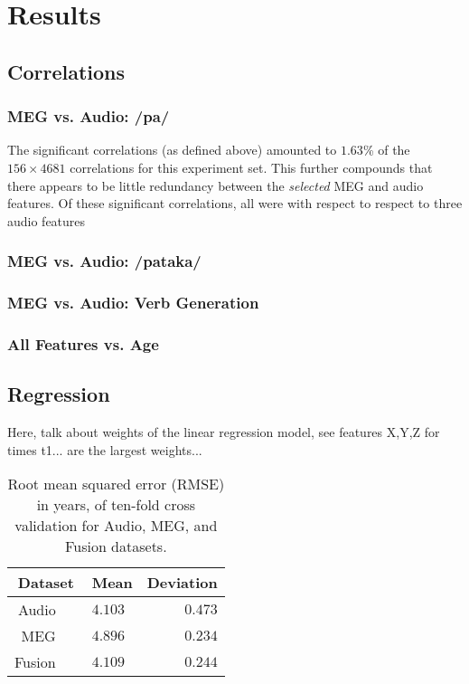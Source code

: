 \documentclass[a4paper]{article}
\begin{document}
\section{Results}

\subsection{Correlations} 

\subsubsection{MEG vs. Audio: /pa/}

The significant correlations (as defined above) amounted to $1.63$\% of the $156 \times 4681$ correlations for this experiment set. This further compounds that there appears to be little redundancy between the \textit{selected} MEG and audio features. Of these significant correlations, all were with respect to respect to three audio features

\subsubsection{MEG vs. Audio: /pataka/}


\subsubsection{MEG vs. Audio: Verb Generation}


\subsubsection{All Features vs. Age}



\subsection{Regression}

Here, talk about weights of the linear regression model, see features X,Y,Z for times t1... are the largest weights...

\begin{table}[t]
  \caption{Root mean squared error (RMSE) in years, of ten-fold cross validation for Audio, MEG, and Fusion datasets.}
  \label{tab:rmse}
  \centering
  \begin{tabular}{ r@{}l  r }
    \toprule
    \multicolumn{1}{c}{\textbf{Dataset}} & \multicolumn{1}{c}{\textbf{Mean}} & \multicolumn{1}{c}{\textbf{Deviation}} \\
    \midrule
    Audio~~~                        & $4.103$         &     $0.473$       \\
    MEG~~~                          & $4.896$         &     $0.234$       \\
    Fusion~~~                       & $4.109$         &     $0.244$       \\
    \bottomrule
  \end{tabular}
\end{table}
\end{document}
